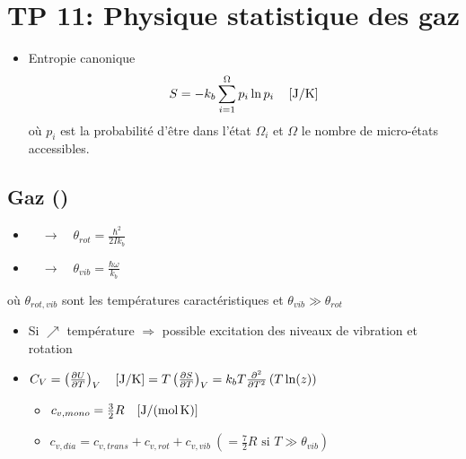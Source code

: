 \section*{TP 11: Physique statistique des gaz}
\begin{itemize}
	\item Entropie canonique
	\begin{equation}
	S = -k_b \sum^\Omega_{i=1}p_i\ln p_i\quad\left[\si[per-mode=symbol]{\joule\per\kelvin}\right]
	\end{equation}
	où \(p_i\)  est la probabilité d'être dans l'état \(\Omega_i\) et \(\Omega\) le nombre de micro-états accessibles.
\end{itemize}
\subsection*{Gaz ()}
\begin{itemize}
	\item { \(\quad\longrightarrow\quad\theta_{rot}=\frac{\hbar^2}{2 I k_b}\)}
	\item  { \(\quad\longrightarrow\quad\theta_{vib}=\frac{\hbar\omega}{k_b}\)}
\end{itemize}
où \(\theta_{rot, vib}\) sont les températures caractéristiques et \(\theta_{vib}\gg\theta_{rot}\)
\begin{itemize}
	\item Si \(\nearrow\) température \(\Rightarrow\) possible excitation des niveaux de vibration et rotation
	\item \(C_V=\left(\frac{\partial U}{\partial T}\right)_V\quad[\si[per-mode=symbol]{\joule\per\kelvin}]= T\left(\frac{\partial S}{\partial T}\right)_V=k_b T\frac{\partial^2}{\partial T^2}\left(T\ln(z)\right)\)
	\begin{itemize}
		\item \(c_{v,mono} = \frac{3}{2}R\quad[\si[per-mode=symbol]{\joule\per\mol\per\kelvin}]\)
		\item \(c_{v,dia}=c_{v,trans}+c_{v,rot}+c_{v,vib}\ (=\frac{7}{2}R\text{ si }T\gg \theta_{vib})\)
	\end{itemize}
\end{itemize}
